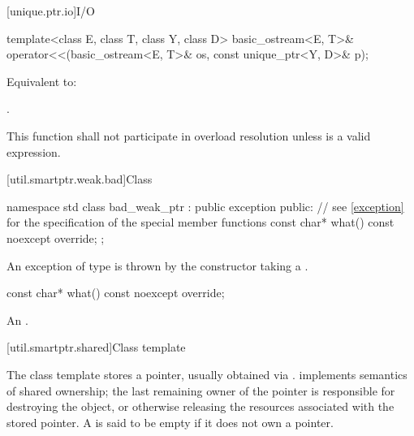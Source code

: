 [unique.ptr.io]{I/O}

%
\begin{itemdecl}
template<class E, class T, class Y, class D>
  basic_ostream<E, T>& operator<<(basic_ostream<E, T>& os, const unique_ptr<Y, D>& p);
\end{itemdecl}

\begin{itemdescr}
\pnum
\effects
Equivalent to: 

\pnum
\returns
{}.

\pnum
\remarks
This function shall not participate in overload resolution
unless  is a valid expression.
\end{itemdescr}

%
[util.smartptr.weak.bad]{Class }
%
\begin{codeblock}
namespace std {
  class bad_weak_ptr : public exception {
  public:
    // see \ref{exception} for the specification of the special member functions
    const char* what() const noexcept override;
  };
}
\end{codeblock}

\pnum
An exception of type  is thrown by the 
constructor taking a .

%
\begin{itemdecl}
const char* what() const noexcept override;
\end{itemdecl}

\begin{itemdescr}
\pnum
\returns
An  \ntbs{}.
\end{itemdescr}

[util.smartptr.shared]{Class template }

\pnum
{}%
The  class template stores a pointer, usually obtained
via .  implements semantics of shared ownership;
the last remaining owner of the pointer is responsible for destroying
the object, or otherwise releasing the resources associated with the stored pointer. A
 is said to be empty if it does not own a pointer.

